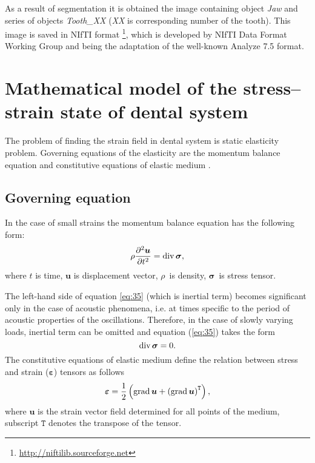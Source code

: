 \documentclass{elsarticle}
\newcommand{\grad}{\mathop{\rm grad}\nolimits}
\renewcommand{\div}{\mathop{\rm div}\nolimits}
\newcommand{\tensor}[1]{\bm{#1}}
\renewcommand{\vec}[1]{\bm{#1}}
\begin{document}
As a result of segmentation it is obtained the image containing object
\emph{Jaw} and series of objects \emph{Tooth\_XX} (\emph{XX} is corresponding
number of the tooth). This image is saved in \textsf{NIfTI} format
\footnote{\url{http://niftilib.sourceforge.net}}, which is developed by
NIfTI Data Format Working Group and being the adaptation of the
well-known \textsf{Analyze 7.5} format.

\section{Mathematical model of the stress--strain state of dental
  system}
\label{sec:2}

The problem of finding the strain field in dental system is
static elasticity problem. Governing equations of the elasticity are
the momentum balance equation and constitutive equations of elastic medium
\cite{LandauLifshic1986,ciarlet1993mathematical}.

\subsection{Governing equation}

In the case of small strains the momentum balance equation has the
following form:
\begin{equation}
  \label{eq:35}
  \rho \frac{\partial^2 \vec{u}}{\partial t^2} = \div\tensor{\sigma},
\end{equation}
where $t$ is time, $\vec{u}$ is displacement vector,  $\rho$~is
density, $\tensor{\sigma}$~is stress tensor.

The left-hand side of equation \ref{eq:35} (which is inertial term)
becomes significant only in the case of acoustic phenomena, i.e. at
times specific to the period of acoustic properties of the
oscillations. Therefore, in the case of slowly varying loads, inertial
term can be omitted and equation (\ref{eq:35}) takes the form
\begin{equation}
  \label{eq:36}
  \div \tensor{\sigma} = 0.
\end{equation}
The constitutive equations of elastic medium define the relation
between stress and strain ($\tensor{\varepsilon}$) tensors as follows
\begin{equation}
  \label{eq:37}
  \tensor{\varepsilon} = \frac{1}{2} \left( \grad \vec{u} + \left( \grad
      \vec{u} \right)^{\mathtt{T}} \right),
\end{equation}
where $\vec{u}$ is the strain vector field determined for all points
of the medium, subscript $\mathtt{T}$ denotes the transpose of the tensor.
\end{document}

